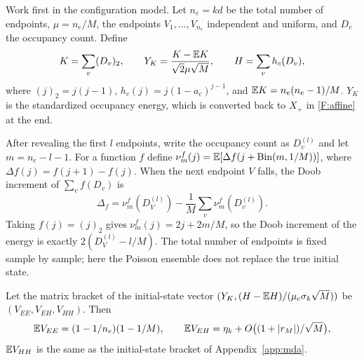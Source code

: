 Work first in the configuration model. Let $n_e=kd$ be the total number of endpoints,
$\mu=n_e/M$, the endpoints $V_1,\ldots,V_{n_e}$ independent and uniform, and $D_v$ the occupancy
count. Define
\begin{equation*}
K=\sum_v(D_v)_2,\qquad Y_K=\frac{K-\mathbb E K}{\sqrt2\mu\sqrt M},\qquad H=\sum_vh_c(D_v),
\end{equation*}
where $(j)_2=j(j-1)$, $h_c(j)=j(1-a_c)^{j-1}$, and $\mathbb E K=n_e(n_e-1)/M$. $Y_K$ is the
standardized occupancy energy, which is converted back to $X_+$ in \eqref{F:affine} at the end.

After revealing the first $l$ endpoints, write the occupancy count as $D_v^{(l)}$ and let
$m=n_e-l-1$. For a function $f$ define
$\nu^f_m(j)=\mathbb E[\Delta f(j+\mathrm{Bin}(m,1/M))]$, where $\Delta f(j)=f(j+1)-f(j)$. When the next
endpoint $V$ falls, the Doob increment of $\sum_vf(D_v)$ is
\begin{equation*}
\Delta_f=\nu^f_m(D_V^{(l)})-\frac1M\sum_v\nu^f_m(D_v^{(l)}).
\end{equation*}
Taking $f(j)=(j)_2$ gives $\nu^f_m(j)=2j+2m/M$, so the Doob increment of the energy is exactly
$2(D_V^{(l)}-l/M)$. The total number of endpoints is fixed sample by sample; here the Poisson
ensemble does not replace the true initial state.

\begin{lemma}\label{F:lem:bracket}
Let the matrix bracket of the initial-state vector $(Y_K,(H-\mathbb E H)/(\mu_c\sigma_k\sqrt M))$ be
$(V_{EE},V_{EH},V_{HH})$. Then
\begin{equation}
\mathbb E V_{EE}=(1-1/n_e)(1-1/M),\qquad \mathbb E V_{EH}=\eta_k+O\bigl((1+|r_M|)/\sqrt M\bigr),\label{F:bracketmean}
\end{equation}
$\mathbb E V_{HH}$ is the same as the initial-state bracket of Appendix~\ref{app:mda}.
\end{lemma}

